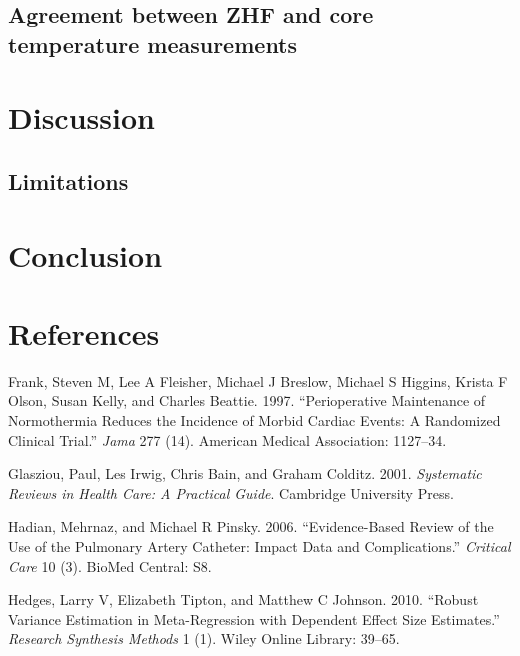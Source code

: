 \documentclass[smallextended]{svjour3}       %
\begin{document}
\hypertarget{agreement-between-zhf-and-core-temperature-measurements}{%
\subsection{Agreement between ZHF and core temperature
measurements}\label{agreement-between-zhf-and-core-temperature-measurements}}

\hypertarget{discussion}{%
\section{Discussion}\label{discussion}}

\hypertarget{limitations}{%
\subsection{Limitations}\label{limitations}}

\hypertarget{conclusion}{%
\section{Conclusion}\label{conclusion}}

\hypertarget{references}{%
\section*{References}\label{references}}

\hypertarget{refs}{}
\leavevmode\hypertarget{ref-frank1997perioperative}{}%
Frank, Steven M, Lee A Fleisher, Michael J Breslow, Michael S Higgins,
Krista F Olson, Susan Kelly, and Charles Beattie. 1997. ``Perioperative
Maintenance of Normothermia Reduces the Incidence of Morbid Cardiac
Events: A Randomized Clinical Trial.'' \emph{Jama} 277 (14). American
Medical Association: 1127--34.

\leavevmode\hypertarget{ref-glasziou2001systematic}{}%
Glasziou, Paul, Les Irwig, Chris Bain, and Graham Colditz. 2001.
\emph{Systematic Reviews in Health Care: A Practical Guide}. Cambridge
University Press.

\leavevmode\hypertarget{ref-hadian2006evidence}{}%
Hadian, Mehrnaz, and Michael R Pinsky. 2006. ``Evidence-Based Review of
the Use of the Pulmonary Artery Catheter: Impact Data and
Complications.'' \emph{Critical Care} 10 (3). BioMed Central: S8.

\leavevmode\hypertarget{ref-hedges2010robust}{}%
Hedges, Larry V, Elizabeth Tipton, and Matthew C Johnson. 2010. ``Robust
Variance Estimation in Meta-Regression with Dependent Effect Size
Estimates.'' \emph{Research Synthesis Methods} 1 (1). Wiley Online
Library: 39--65.
\end{document}
